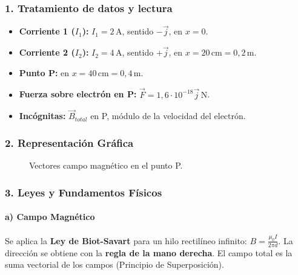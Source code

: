 \subsubsection*{1. Tratamiento de datos y lectura}
\begin{itemize}
    \item \textbf{Corriente 1 ($I_1$):} $I_1=2\,\text{A}$, sentido $-\vec{j}$, en $x=0$.
    \item \textbf{Corriente 2 ($I_2$):} $I_2=4\,\text{A}$, sentido $+\vec{j}$, en $x=20\,\text{cm} = 0,2\,\text{m}$.
    \item \textbf{Punto P:} en $x=40\,\text{cm} = 0,4\,\text{m}$.
    \item \textbf{Fuerza sobre electrón en P:} $\vec{F}=1,6\cdot10^{-18}\vec{j}\,\text{N}$.
    \item \textbf{Incógnitas:} $\vec{B}_{total}$ en P, módulo de la velocidad del electrón.
\end{itemize}
\subsubsection*{2. Representación Gráfica}
\begin{figure}[H]
    \centering
    \caption{Vectores campo magnético en el punto P.}
\end{figure}
\subsubsection*{3. Leyes y Fundamentos Físicos}
\paragraph{a) Campo Magnético}
Se aplica la \textbf{Ley de Biot-Savart} para un hilo rectilíneo infinito: $B = \frac{\mu_0 I}{2\pi d}$. La dirección se obtiene con la \textbf{regla de la mano derecha}. El campo total es la suma vectorial de los campos (Principio de Superposición).
